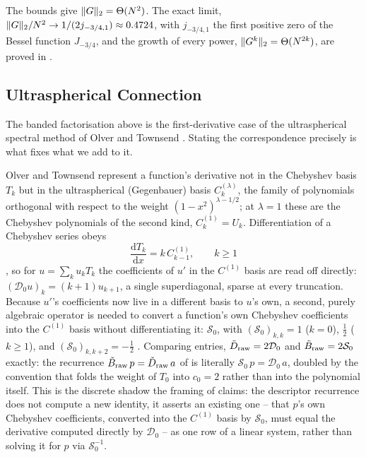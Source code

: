 The bounds give $\|G\|_2=\Theta(N^2)$. The exact limit, $\|G\|_2/N^2\to1/(2j_{-3/4,1})\approx0.4724$, with $j_{-3/4,1}$ the first positive zero of the Bessel function $J_{-3/4}$, and the growth of every power, $\|G^k\|_2=\Theta(N^{2k})$, are proved in .

\subsection{Ultraspherical Connection}
\label{app:ultraspherical}

The banded factorisation above is the first-derivative case of the
ultraspherical spectral method of Olver and Townsend \cite{olver2013}. Stating
the correspondence precisely is what fixes what we add to it.

Olver and Townsend represent a function's derivative not in the Chebyshev
basis $T_k$ but in the ultraspherical (Gegenbauer) basis $C_k^{(\lambda)}$,
the family of polynomials orthogonal with respect to the weight
$(1-x^2)^{\lambda - 1/2}$; at $\lambda = 1$ these are the Chebyshev
polynomials of the second kind, $C_k^{(1)} = U_k$. Differentiation of a
Chebyshev series obeys
\begin{equation}
    \frac{\mathrm{d}T_k}{\mathrm{d}x} = k\,C^{(1)}_{k-1} , \qquad k \ge 1
    \label{eq:app-ot-diff}
\end{equation}
\cite[Eq.~2.5]{olver2013}, so for $u = \sum_k u_k T_k$ the coefficients of
$u'$ in the $C^{(1)}$ basis are read off directly: $(\mathcal{D}_0 u)_k =
(k+1)u_{k+1}$, a single superdiagonal, sparse at every truncation. Because
$u'$'s coefficients now live in a different basis to $u$'s own, a second,
purely algebraic operator is needed to convert a function's own Chebyshev
coefficients into the $C^{(1)}$ basis without differentiating it:
$\mathcal{S}_0$, with $(\mathcal{S}_0)_{k,k} = 1$ ($k=0$), $\tfrac12$ ($k \ge
1$), and $(\mathcal{S}_0)_{k,k+2} = -\tfrac12$ \cite[Eq.~2.8]{olver2013}.
Comparing entries, $\tilde{D}_\mathrm{raw} = 2\mathcal{D}_0$ and
$\tilde{B}_\mathrm{raw} = 2\mathcal{S}_0$ exactly: the recurrence
$\tilde{B}_\mathrm{raw}\,p = \tilde{D}_\mathrm{raw}\,a$ of
 is literally $\mathcal{S}_0\,p = \mathcal{D}_0\,a$,
doubled by the convention that folds the weight of $T_0$ into $c_0 = 2$
rather than into the polynomial itself. This is the discrete shadow the
framing of  claims: the descriptor
recurrence does not compute a new identity, it asserts an existing one --
that $p$'s own Chebyshev coefficients, converted into the $C^{(1)}$ basis by
$\mathcal{S}_0$, must equal the derivative computed directly by
$\mathcal{D}_0$ -- as one row of a linear system, rather than solving it for
$p$ via $\mathcal{S}_0^{-1}$.

